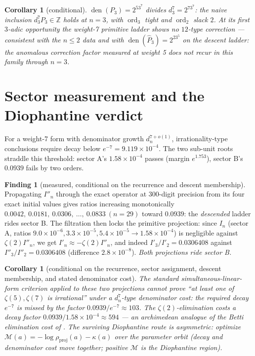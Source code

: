\documentclass[11pt]{article}
\newtheorem{corollary}[theorem]{Corollary}
\theoremstyle{definition}\newtheorem{remark}[theorem]{Remark}
\newtheorem{finding}[theorem]{Finding}
\DeclareMathOperator{\ord}{ord}\DeclareMathOperator{\den}{den}\DeclareMathOperator{\lcm}{lcm}
\newcommand{\Z}{\mathbb{Z}}\newcommand{\Q}{\mathbb{Q}}\newcommand{\Fp}{\mathbb{F}_p}
\newcommand{\zt}[1]{\zeta(#1)}
\begin{document}
\begin{corollary}[conditional]\label{cor:noanomaly}
$\den(P_3)=2^53^7$ divides $d_3^7=2^73^7$: the naive inclusion
$d_3^7P_3\in\Z$ holds at $n=3$, with $\ord_3$ tight and $\ord_2$ slack $2$. At
its first $3$-adic opportunity the weight-7 primitive ladder shows \emph{no}
$12$-type correction --- consistent with the $n\le2$ data and with
$\den(\hat P_3)=2^23^5$ on the descent ladder: the anomalous correction factor
measured at weight 5 \cite{Denoms} does not recur in this family through $n=3$.
\end{corollary}

\section{Sector measurement and the Diophantine verdict}\label{sec:sector}

For a weight-7 form with denominator growth $d_n^{7+o(1)}$, irrationality-type
conclusions require decay below $e^{-7}=9.119\times10^{-4}$. The two sub-unit
roots straddle this threshold: sector A's $1.58\times10^{-4}$ passes (margin
$e^{1.753}$), sector B's $0.0939$ fails by two orders.

\begin{finding}[measured, conditional on the recurrence and descent membership]\label{find:sector}
Propagating $I''_n$ through the exact operator at $300$-digit precision from
its four exact initial values gives ratios increasing monotonically
$0.0042,\ 0.0181,\ 0.0306,\ \ldots,\ 0.0833\ (n=29)$ toward $0.0939$: the
\emph{descended} ladder rides sector B. The filtration then locks the
primitive projection: since $I_n$ (sector A, ratios
$9.0\times10^{-6},3.3\times10^{-5},5.4\times10^{-5}\to1.58\times10^{-4}$) is
negligible against $\zt2 I''_n$, we get $I'_n\approx-\zt2I''_n$, and indeed
$I'_3/I'_2=0.0306408$ against $I''_3/I''_2=0.0306408$ (difference
$2.8\times10^{-8}$). \emph{Both projections ride sector B.}
\end{finding}

\begin{corollary}[conditional on the recurrence, sector assignment, descent
membership, and stated denominator cost]
The standard simultaneous-linear-form criterion applied to these two
projections cannot prove ``at least one of $\zt5,\zt7$ is irrational'' under a
$d_n^7$-type denominator cost: the
required decay $e^{-7}$ is missed by the factor $0.0939/e^{-7}\approx103$.
The $\zt2$-elimination costs a decay factor $0.0939/1.58\times10^{-4}
\approx594$ --- an archimedean analogue of the Betti elimination cost of
\cite{Denoms}. The surviving Diophantine route is asymmetric: optimize
$\mathcal M(a)=-\log\rho_{\mathrm{proj}}(a)-\kappa(a)$ over the parameter
orbit (decay and denominator cost move together; positive $\mathcal M$ is the
Diophantine region).
\end{corollary}
\end{document}

